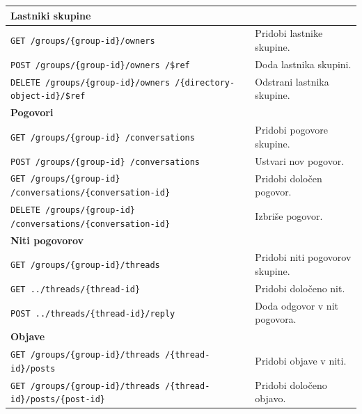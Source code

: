 \documentclass[a4paper, 12pt]{book}
\begin{document}
\begin{longtable}{|p{7cm}|p{7.5cm}|}
\multicolumn{2}{|l|}{\textbf{Lastniki skupine}} \\
\hline

\texttt{GET /groups/\{group-id\}/owners} &
Pridobi lastnike skupine. \\
\hline

\texttt{POST /groups/\{group-id\}/owners
/\$ref} &
Doda lastnika skupini. \\
\hline

\texttt{DELETE /groups/\{group-id\}/owners
/\{directory-object-id\}/\$ref} &
Odstrani lastnika skupine. \\
\hline

\multicolumn{2}{|l|}{\textbf{Pogovori}} \\
\hline

\texttt{GET /groups/\{group-id\}
/conversations} &
Pridobi pogovore skupine. \\
\hline

\texttt{POST /groups/\{group-id\}
/conversations} &
Ustvari nov pogovor. \\
\hline

\texttt{GET /groups/\{group-id\}
/conversations/\{conversation-id\}} &
Pridobi določen pogovor. \\
\hline

\texttt{DELETE /groups/\{group-id\}
/conversations/\{conversation-id\}} &
Izbriše pogovor. \\
\hline

\multicolumn{2}{|l|}{\textbf{Niti pogovorov}} \\
\hline

\texttt{GET /groups/\{group-id\}/threads} &
Pridobi niti pogovorov skupine. \\
\hline

\texttt{GET ../threads/\{thread-id\}} &
Pridobi določeno nit. \\
\hline

\texttt{POST ../threads/\{thread-id\}/reply} &
Doda odgovor v nit pogovora. \\
\hline

\multicolumn{2}{|l|}{\textbf{Objave}} \\
\hline

\texttt{GET /groups/\{group-id\}/threads
/\{thread-id\}/posts} &
Pridobi objave v niti. \\
\hline

\texttt{GET /groups/\{group-id\}/threads
/\{thread-id\}/posts/\{post-id\}} &
Pridobi določeno objavo. \\
\hline


\end{longtable}
\end{document}
